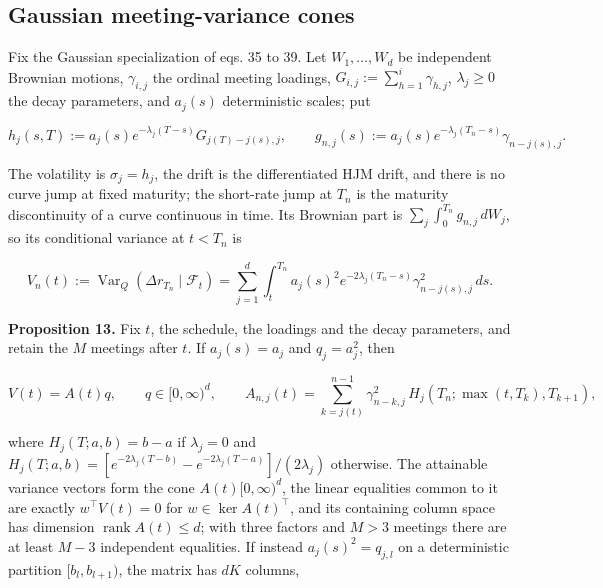 \documentclass[11pt]{article}
\begin{document}
\subsection{Gaussian meeting-variance cones}\label{sec:3.11}

Fix the Gaussian specialization of \cite{brace2024sofr} eqs. 35 to 39. Let \(W_1, \dots, W_d\) be independent Brownian motions, \(\gamma_{i,j}\) the ordinal meeting loadings, \(G_{i,j} := \sum_{h=1}^i \gamma_{h,j}\), \(\lambda_j \ge 0\) the decay parameters, and \(a_j(s)\) deterministic scales; put

\begin{equation*}
h_j(s, T) := a_j(s) e^{-\lambda_j (T - s)} G_{j(T) - j(s), j}, \qquad g_{n,j}(s) := a_j(s) e^{-\lambda_j (T_n - s)} \gamma_{n - j(s), j}. \tag{3.49}\label{eq:3.49}
\end{equation*}

The volatility is \(\sigma_j = h_j\), the drift is the differentiated HJM drift, and there is no curve jump at fixed maturity; the short-rate jump at \(T_n\) is the maturity discontinuity of a curve continuous in time. Its Brownian part is \(\sum_j \int_0^{T_n} g_{n,j}\,dW_j\), so its conditional variance at \(t < T_n\) is

\begin{equation*}
V_n(t) := \operatorname{Var}_Q(\Delta r_{T_n} \mid \mathcal F_t) = \sum_{j=1}^d \int_t^{T_n} a_j(s)^2 e^{-2\lambda_j (T_n - s)} \gamma_{n - j(s), j}^2\,ds. \tag{3.50}\label{eq:3.50}
\end{equation*}

\label{res:Proposition-13}
\textbf{Proposition 13.} Fix \(t\), the schedule, the loadings and the decay parameters, and retain the \(M\) meetings after \(t\). If \(a_j(s) = a_j\) and \(q_j = a_j^2\), then

\begin{equation*}
V(t) = A(t) q, \qquad q \in [0, \infty)^d, \qquad A_{n,j}(t) = \sum_{k = j(t)}^{n-1} \gamma_{n-k, j}^2\, H_j(T_n; \max(t, T_k), T_{k+1}), \tag{3.51}\label{eq:3.51}
\end{equation*}

where \(H_j(T; a, b) = b - a\) if \(\lambda_j = 0\) and \(H_j(T; a, b) = [e^{-2\lambda_j (T - b)} - e^{-2\lambda_j (T - a)}] / (2\lambda_j)\) otherwise. The attainable variance vectors form the cone \(A(t)[0, \infty)^d\), the linear equalities common to it are exactly \(w^\top V(t) = 0\) for \(w \in \ker A(t)^\top\), and its containing column space has dimension \(\operatorname{rank} A(t) \le d\); with three factors and \(M > 3\) meetings there are at least \(M - 3\) independent equalities. If instead \(a_j(s)^2 = q_{j,l}\) on a deterministic partition \([b_l, b_{l+1})\), the matrix has \(dK\) columns,
\end{document}
